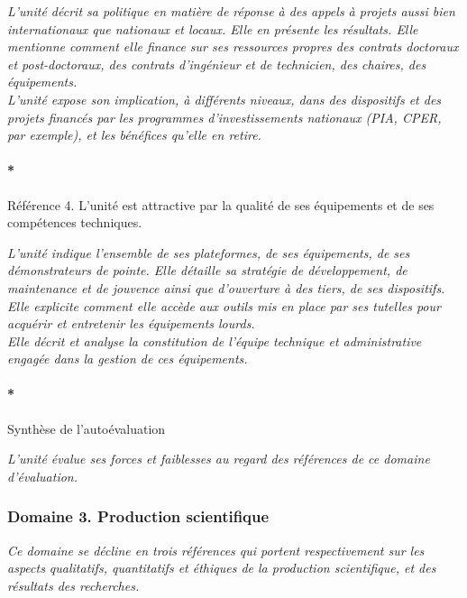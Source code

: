 \documentclass[]{article}
\let\oldparagraph\paragraph
\renewcommand{\paragraph}[1]{\oldparagraph{#1}\mbox{}}
\newcommand{\instructions}[1]{{\em \color{hceresgreen}#1}}
\begin{document}
\instructions{L’unité décrit sa politique en matière de réponse à des appels à projets aussi bien internationaux que nationaux et locaux. Elle en présente les résultats.
Elle mentionne comment elle finance sur ses ressources propres des contrats doctoraux et post-doctoraux, des contrats d’ingénieur et de technicien, des chaires, des équipements.\\

L’unité expose son implication, à différents niveaux, dans des dispositifs et des projets financés par les programmes d’investissements nationaux (PIA, CPER, par exemple), et les bénéfices qu’elle en retire.}

\paragraph*{Référence 4. L'unité est attractive par la qualité de ses
équipements et de ses compétences techniques.}

\instructions{L’unité indique l’ensemble de ses plateformes, de ses équipements, de ses démonstrateurs de pointe. Elle détaille sa stratégie de développement, de maintenance et de jouvence ainsi que d’ouverture à des tiers, de ses dispositifs. Elle explicite comment elle accède aux outils mis en place par ses tutelles pour acquérir et entretenir les équipements lourds.\\

Elle décrit et analyse la constitution de l’équipe technique et administrative engagée dans la gestion de ces équipements.}

\paragraph*{Synthèse de l'autoévaluation}

\instructions{L’unité évalue ses forces et faiblesses au regard des références de ce domaine d’évaluation.}

\subsubsection*{Domaine 3. Production scientifique}

\instructions{Ce domaine se décline en trois références qui portent respectivement sur les aspects qualitatifs, quantitatifs et éthiques de la production scientifique, et des résultats des recherches.}
\end{document}
